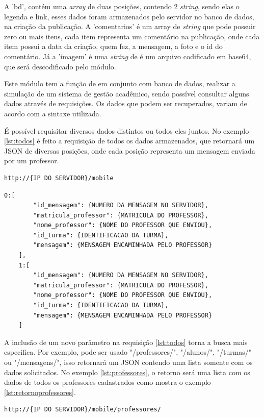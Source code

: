A 'bd', contém uma \textit{array} de duas posições, contendo 2 \textit{string}, sendo elas o legenda e link, esses dados foram armazenados pelo servidor no banco de dados, na criação da publicação. A 'comentarios' é um array de \textit{string} que pode possuir zero ou mais itens, cada item representa um comentário na publicação, onde cada item possui a data da criação, quem fez, a mensagem, a foto e o id do comentário. Já a 'imagem' é uma \textit{string} de é um arquivo codificado em base64, que será descodificado pelo módulo.

Este módulo tem a função de em conjunto com banco de dados, realizar a simulação de um sistema de gestão acadêmico, sendo possível consultar alguns dados através de requisições. Os dados que podem ser recuperados, variam de acordo com a sintaxe utilizada.

É possível requisitar diversos dados distintos ou todos eles juntos. 
No exemplo \ref{lst:todos} é feito a requisição de todos os dados armazenados, que retornará um JSON de diversas posições, onde cada posição representa um mensagem enviada por um professor.
\begin{lstlisting}[caption={Requisitar todos os dados},label={lst:todos}]
	http://{IP DO SERVIDOR}/mobile
\end{lstlisting}

\begin{lstlisting}[caption={Retorno da requisição \ref{lst:todos}},label={lst:retornotodos}]
	0:[
		"id_mensagem": {NUMERO DA MENSAGEM NO SERVIDOR},
		"matricula_professor": {MATRICULA DO PROFESSOR},
		"nome_professor": {NOME DO PROFESSOR QUE ENVIOU},
		"id_turma": {IDENTIFICACAO DA TURMA},
		"mensagem": {MENSAGEM ENCAMINHADA PELO PROFESSOR}
	],
	1:[		
		"id_mensagem": {NUMERO DA MENSAGEM NO SERVIDOR},
		"matricula_professor": {MATRICULA DO PROFESSOR},
		"nome_professor": {NOME DO PROFESSOR QUE ENVIOU},
		"id_turma": {IDENTIFICACAO DA TURMA},
		"mensagem": {MENSAGEM ENCAMINHADA PELO PROFESSOR}
	]
\end{lstlisting}

A inclusão de um novo parâmetro na requisição \ref{lst:todos} torna a busca mais específica. Por exemplo, pode ser usado "/professores/", "/alunos/", "/turmas/" ou "/mensagens/", isso retornará um JSON contendo uma lista somente com os dados solicitados. No exemplo \ref{lst:professores}, o retorno será uma lista com os dados de todos os professores cadastrados como mostra o exemplo \ref{lst:retornoprofessores}.

\begin{lstlisting}[caption={Requisitar lista de dados especifica},label={lst:professores}]
	http://{IP DO SERVIDOR}/mobile/professores/
\end{lstlisting}

